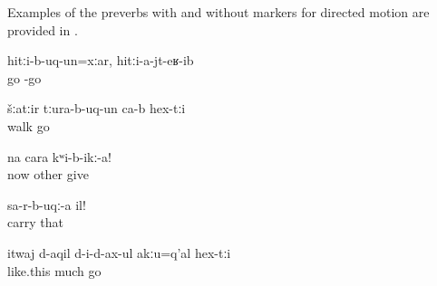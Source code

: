 Examples of the preverbs with and without markers for directed motion are provided in .
%
\begin{exe}
	\ex	\label{ex:Even though (the hare) run after (the turtle), it did not reach it verbs}
	\gll	hitːi-b-uq-un=xːar,	hitːi-a-jt-eʁ-ib\\
		go	-go\\
	\glt	{}

	\ex	\label{ex:They went out for a walk verbs}
	\gll	šːatːir	tːura-b-uq-un	ca-b	hex-tːi\\
		walk	go		\\
	\glt	{}

	\ex	\label{ex:Now give another (picture) verbs}
	\gll	na	cara	kʷi-b-ikː-a!\\
		now	other	give\\
	\glt	{}

	\ex	\label{ex:Take it away (from in front) verbs}
	\gll	sa-r-b-uqː-a	il!\\
		carry	that\\
	\glt	{}

	\ex	\label{ex:Otherwise not much (hay) fits inside verbs}
	\gll	itwaj	d-aqil	d-i-d-ax-ul	akːu=q'al	hex-tːi\\
		like.this	much	go		\\
	\glt	{}
\end{exe}

